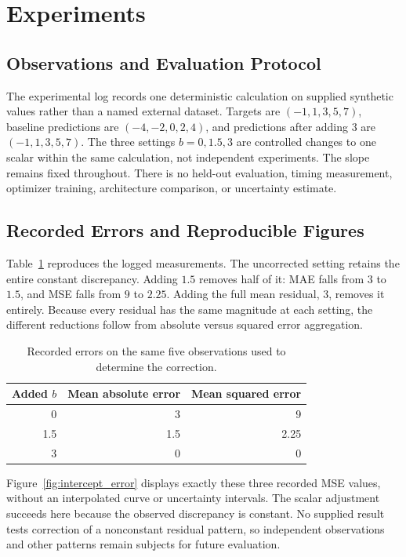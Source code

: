 \documentclass[11pt]{article}
\begin{document}
\section{Experiments}

\subsection{Observations and Evaluation Protocol}

The experimental log records one deterministic calculation on supplied synthetic values rather than a named external dataset. Targets are $(-1,1,3,5,7)$, baseline predictions are $(-4,-2,0,2,4)$, and predictions after adding $3$ are $(-1,1,3,5,7)$. The three settings $b=0,1.5,3$ are controlled changes to one scalar within the same calculation, not independent experiments. The slope remains fixed throughout. There is no held-out evaluation, timing measurement, optimizer training, architecture comparison, or uncertainty estimate.

\subsection{Recorded Errors and Reproducible Figures}

Table~\ref{tab:recorded_errors} reproduces the logged measurements. The uncorrected setting retains the entire constant discrepancy. Adding $1.5$ removes half of it: MAE falls from $3$ to $1.5$, and MSE falls from $9$ to $2.25$. Adding the full mean residual, $3$, removes it entirely. Because every residual has the same magnitude at each setting, the different reductions follow from absolute versus squared error aggregation.

\begin{table}[htbp]
    \centering
    \caption{Recorded errors on the same five observations used to determine the correction.}
    \label{tab:recorded_errors}
    \begin{tabular}{rrr}
        \toprule
        Added $b$ & Mean absolute error & Mean squared error \\
        \midrule
        0   & 3   & 9    \\
        1.5 & 1.5 & 2.25 \\
        3   & 0   & 0    \\
        \bottomrule
    \end{tabular}
\end{table}

Figure~\ref{fig:intercept_error} displays exactly these three recorded MSE values, without an interpolated curve or uncertainty intervals. The scalar adjustment succeeds here because the observed discrepancy is constant. No supplied result tests correction of a nonconstant residual pattern, so independent observations and other patterns remain subjects for future evaluation.
\end{document}
